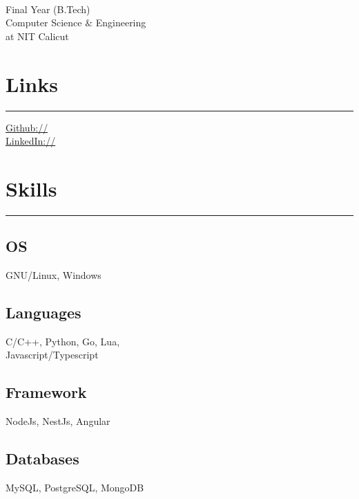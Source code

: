 \documentclass[]{resume}
\begin{document}
%
%

\begin{minipage}[t]{0.33\textwidth} 
\begin{large}
	\\
\end{large}
Final Year (B.Tech)\\
Computer Science $\&$  Engineering\\ 
at NIT Calicut \\ 

\section{Links} 
\noindent\rule{5cm}{0.8pt}

\href{https://github.com/ph4t3}{Github:// } \\
\href{https://www.linkedin.com/in/nikhil-rajesh1999}{LinkedIn://  }
\vspace{6pt}
\section{Skills}
\noindent\rule{5cm}{0.8pt}
\subsection{OS}
GNU/Linux, Windows
\vspace{6pt}
\subsection{Languages}
C/C++, Python, Go, Lua, \\
Javascript/Typescript
\vspace{6pt}
\subsection{Framework}
NodeJs, NestJs, Angular
\vspace{6pt}
\subsection{Databases}
MySQL, PostgreSQL, MongoDB
\vspace{6pt}

\end{minipage}
\end{document}
